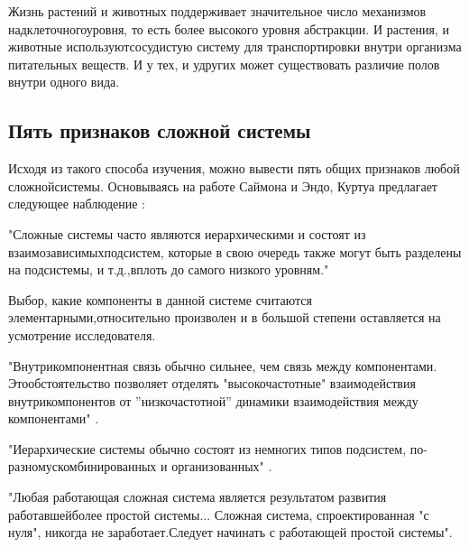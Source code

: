\documentclass[11pt]{article}
\begin{document}
Жизнь растений и животных поддерживает значительное число механизмов надклеточного\linebreak уровня, то есть более высокого уровня абстракции. И растения, и животные используют\linebreak сосудистую систему для транспортировки внутри организма питательных веществ. И у тех, и у\linebreak других может существовать различие полов внутри одного вида. 
 
\subsection{Пять признаков сложной системы}
Исходя из такого способа изучения, можно вывести пять общих признаков любой сложной\linebreak системы. Основываясь на работе Саймона и Эндо, Куртуа предлагает следующее наблюдение \cite{n7}: 
\begin{enumerate}
{\it
\item "Сложные системы часто являются иерархическими и состоят из взаимозависимых\linebreak подсистем, которые в свою очередь также могут быть разделены на подсистемы, и т.д.,\linebreak вплоть до самого низкого уровням." 
\item Выбор, какие компоненты в данной системе считаются элементарными,\linebreak относительно произволен и в большой степени оставляется на усмотрение исследователя. 
\item "Внутрикомпонентная связь обычно сильнее, чем связь между компонентами. Это\linebreak обстоятельство позволяет отделять "высокочастотные" взаимодействия внутри\linebreak компонентов от ''низкочастотной'' динамики взаимодействия между компонентами" \cite{n10}. 
\item "Иерархические системы обычно состоят из немногих типов подсистем, по-разному\linebreak скомбинированных и организованных" \cite{n11}. 
\item "Любая работающая сложная система является результатом развития работавшей\linebreak более простой системы... Сложная система, спроектированная "с нуля", никогда не заработает.\linebreak Следует начинать с работающей простой системы". 
}
\end{enumerate}
\end{document}
